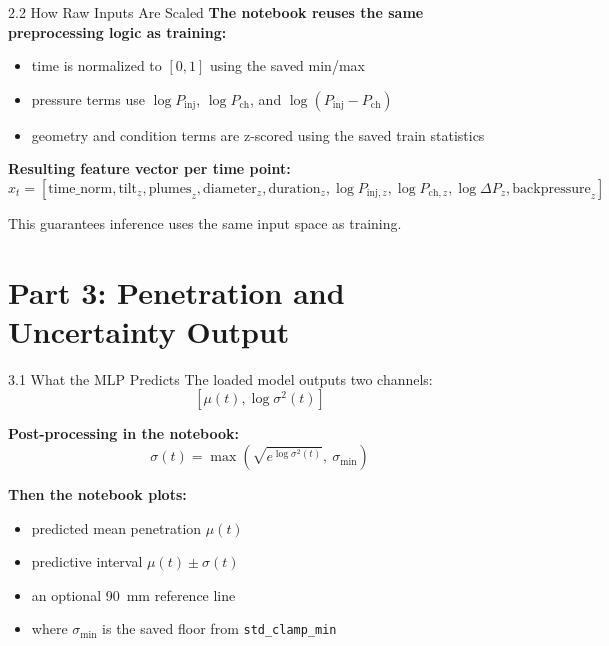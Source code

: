 \documentclass[UTF8,aspectratio=169]{ctexbeamer}
\begin{document}
\begin{frame}{2.2 How Raw Inputs Are Scaled}
\textbf{The notebook reuses the same preprocessing logic as training:}
\begin{itemize}
  \item time is normalized to $[0,1]$ using the saved min/max
  \item pressure terms use $\log P_{\text{inj}}$, $\log P_{\text{ch}}$, and $\log(P_{\text{inj}}-P_{\text{ch}})$
  \item geometry and condition terms are z-scored using the saved train statistics
\end{itemize}

\vspace{0.3em}
\textbf{Resulting feature vector per time point:}
\[
x_t =
[
\text{time\_norm},
\text{tilt}_z,
\text{plumes}_z,
\text{diameter}_z,
\text{duration}_z,
\log P_{\text{inj},z},
\log P_{\text{ch},z},
\log \Delta P_z,
\text{backpressure}_z
]
\]

\vspace{0.3em}
This guarantees inference uses the same input space as training.
\end{frame}

\section{Part 3: Penetration and Uncertainty Output}

\begin{frame}{3.1 What the MLP Predicts}
The loaded model outputs two channels:
\[
[\mu(t), \log \sigma^2(t)]
\]

\vspace{0.3em}
\textbf{Post-processing in the notebook:}
\[
\sigma(t) = \max\!\left(\sqrt{e^{\log \sigma^2(t)}},\ \sigma_{\min}\right)
\]

\vspace{0.3em}
\textbf{Then the notebook plots:}
\begin{itemize}
  \item predicted mean penetration $\mu(t)$
  \item predictive interval $\mu(t)\pm \sigma(t)$
  \item an optional \SI{90}{mm} reference line
  \item where $\sigma_{\min}$ is the saved floor from \texttt{std\_clamp\_min}
\end{itemize}
\end{frame}
\end{document}
